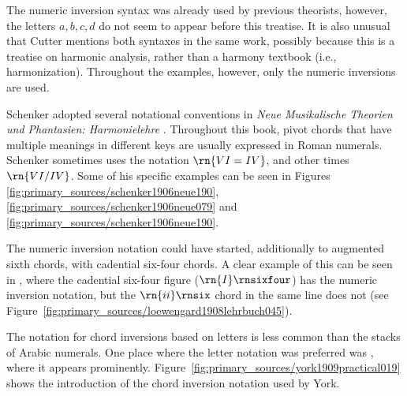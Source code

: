 
The numeric inversion syntax was already used by previous theorists, however, the letters ${a, b, c , d}$ do not seem to appear before this treatise.
It is also unusual that Cutter mentions both syntaxes in the same work, possibly because this is a treatise on harmonic analysis, rather than a harmony textbook (i.e., harmonization).
Throughout the examples, however, only the numeric inversions are used.

Schenker adopted several notational conventions in \emph{Neue Musikalische Theorien und Phantasien: Harmonielehre} \parencite{schenker1906neue}.
Throughout this book, pivot chords that have multiple meanings in different keys are usually expressed in Roman numerals.
Schenker sometimes uses the notation $\rn{VI=IV}$, and other times $\rn{VI/IV}$.
Some of his specific examples can be seen in Figures \ref{fig:primary_sources/schenker1906neue190}, \ref{fig:primary_sources/schenker1906neue079} and \ref{fig:primary_sources/schenker1906neue190}.




The numeric inversion notation could have started, additionally to augmented sixth chords, with cadential six-four chords.
A clear example of this can be seen in \textcite{loewengard1908lehrbuch}, where the cadential six-four figure ($\rn{I}\rnsixfour$) has the numeric inversion notation, but the $\rn{ii}\rnsix$ chord in the same line does not (see Figure~\ref{fig:primary_sources/loewengard1908lehrbuch045}).


The notation for chord inversions based on letters is less common than the stacks of Arabic numerals.
One place where the letter notation was preferred was \textcite{york1909practical}, where it appears prominently.
Figure~\ref{fig:primary_sources/york1909practical019} shows the introduction of the chord inversion notation used by York.


